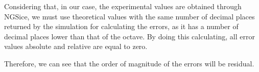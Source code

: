 Considering that, in our case, the experimental values are obtained through NGSice, we must use theoretical values with the same number of decimal places returned by the simulation for calculating the errors, as it has a number of decimal places lower than that of the octave. By doing this calculating, all error values absolute and relative are equal to zero. 

Therefore, we can see that the order of magnitude of the errors will be residual.




